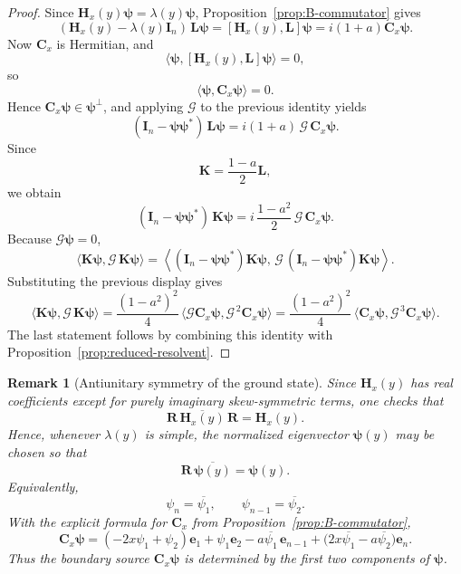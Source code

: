 \documentclass[11pt]{article}
\newtheorem{remark}[theorem]{Remark}
\begin{document}
\begin{proof}
Since \(\mathbf H_x(y)\boldsymbol{\psi}=\lambda(y)\boldsymbol{\psi}\), Proposition~\ref{prop:B-commutator} gives
\[
(\mathbf H_x(y)-\lambda(y)\mathbf I_n)\,\mathbf L\boldsymbol{\psi}
=
[\mathbf H_x(y),\mathbf L]\boldsymbol{\psi}
=
i(1+a)\mathbf C_x\boldsymbol{\psi}.
\]
Now \(\mathbf C_x\) is Hermitian, and
\[
\langle \boldsymbol{\psi},[\mathbf H_x(y),\mathbf L]\boldsymbol{\psi}\rangle=0,
\]
so
\[
\langle \boldsymbol{\psi},\mathbf C_x\boldsymbol{\psi}\rangle=0.
\]
Hence \(\mathbf C_x\boldsymbol{\psi}\in \boldsymbol{\psi}^\perp\), and applying \(\mathcal G\) to the previous identity yields
\[
(\mathbf I_n-\boldsymbol{\psi}\boldsymbol{\psi}^*)\,\mathbf L\boldsymbol{\psi}
=
i(1+a)\,\mathcal G\,\mathbf C_x\boldsymbol{\psi}.
\]
Since
\[
\mathbf K=\frac{1-a}{2}\mathbf L,
\]
we obtain
\[
(\mathbf I_n-\boldsymbol{\psi}\boldsymbol{\psi}^*)\,\mathbf K\boldsymbol{\psi}
=
i\,\frac{1-a^2}{2}\,\mathcal G\,\mathbf C_x\boldsymbol{\psi}.
\]
Because \(\mathcal G\boldsymbol{\psi}=0\),
\[
\langle \mathbf K\boldsymbol{\psi},\mathcal G\,\mathbf K\boldsymbol{\psi}\rangle
=
\left\langle
(\mathbf I_n-\boldsymbol{\psi}\boldsymbol{\psi}^*)\mathbf K\boldsymbol{\psi},\,
\mathcal G\,(\mathbf I_n-\boldsymbol{\psi}\boldsymbol{\psi}^*)\mathbf K\boldsymbol{\psi}
\right\rangle.
\]
Substituting the previous display gives
\[
\langle \mathbf K\boldsymbol{\psi},\mathcal G\,\mathbf K\boldsymbol{\psi}\rangle
=
\frac{(1-a^2)^2}{4}\,
\langle \mathcal G\mathbf C_x\boldsymbol{\psi},\mathcal G^{\,2}\mathbf C_x\boldsymbol{\psi}\rangle
=
\frac{(1-a^2)^2}{4}\,
\langle \mathbf C_x\boldsymbol{\psi},\mathcal G^{\,3}\mathbf C_x\boldsymbol{\psi}\rangle.
\]
The last statement follows by combining this identity with Proposition~\ref{prop:reduced-resolvent}.
\end{proof}

\begin{remark}[Antiunitary symmetry of the ground state]\label{rem:antiunitary}
Since \(\mathbf H_x(y)\) has real coefficients except for purely imaginary skew-symmetric terms, one checks that
\[
\mathbf R\,\overline{\mathbf H_x(y)}\,\mathbf R=\mathbf H_x(y).
\]
Hence, whenever \(\lambda(y)\) is simple, the normalized eigenvector \(\boldsymbol{\psi}(y)\) may be chosen so that
\[
\mathbf R\,\overline{\boldsymbol{\psi}(y)}=\boldsymbol{\psi}(y).
\]
Equivalently,
\[
\psi_n=\overline{\psi_1},
\qquad
\psi_{n-1}=\overline{\psi_2}.
\]
With the explicit formula for \(\mathbf C_x\) from Proposition~\ref{prop:B-commutator},
\[
\mathbf C_x\boldsymbol{\psi}
=
(-2x\psi_1+\psi_2)\mathbf e_1
+\psi_1\mathbf e_2
-a\overline{\psi_1}\,\mathbf e_{n-1}
+\bigl(2x\overline{\psi_1}-a\overline{\psi_2}\bigr)\mathbf e_n.
\]
Thus the boundary source \(\mathbf C_x\boldsymbol{\psi}\) is determined by the first two components of \(\boldsymbol{\psi}\).
\end{remark}
\end{document}
